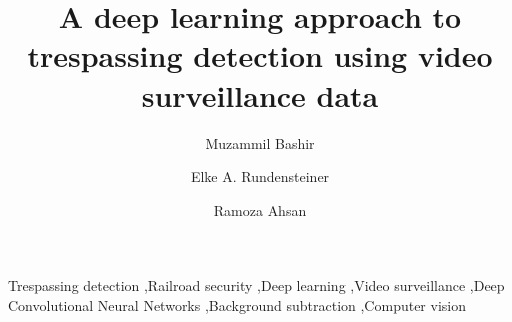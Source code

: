 \documentclass[preprint,3p,times,twocolumn]{elsarticle}
\begin{document}
\begin{frontmatter}
\title{A deep learning approach to trespassing detection using video surveillance data}


\author{Muzammil Bashir}
\author{Elke A. Rundensteiner}
\author{Ramoza Ahsan}

\address{Department of Computer Science, Worcester Polytechnic Institute, United States}





\begin{keyword}
Trespassing detection \sep Railroad security \sep Deep learning \sep Video surveillance \sep Deep Convolutional Neural Networks \sep Background subtraction \sep Computer vision
\end{keyword}

\end{frontmatter}










\end{document}
